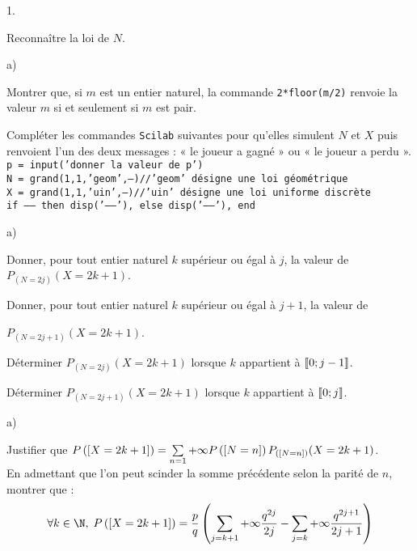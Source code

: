 \documentclass[11pt]{article}%
\begin{document}
\begin{noliste}{1.}
 \setlength{\itemsep}{4mm}
\item Reconnaître la loi de $N$.

\item 
\begin{noliste}{a)}
 \setlength{\itemsep}{2mm}
\item Montrer que, si $m$ est un entier naturel, la commande
\texttt{2*floor(m/2)} renvoie la valeur $m$ si et seulement si $m$ est
pair.

\item Compléter les commandes \texttt{Scilab} suivantes pour qu'elles
simulent $N$ et $X$ puis renvoient l'un des deux messages : « le joueur
a gagné » ou « le joueur a perdu ».\\
\texttt{p = input('donner la valeur de p') \\
N = grand(1,1,'geom',---)//'geom' désigne une loi géométrique\\
X = grand(1,1,'uin',---)//'uin' désigne une loi uniforme discrète \\
if ------ then disp('------'), else disp('------'), end}
\end{noliste}

\item 
\begin{noliste}{a)}
 \setlength{\itemsep}{2mm}
\item Donner, pour tout entier naturel $k$ supérieur ou égal à $j$, la
valeur de $P_{(N = 2j)}(X = 2k + 1)$.

\item Donner, pour tout entier naturel $k$ supérieur ou égal à $j + 1$,
la valeur de 

$P_{(N = 2j + 1)}(X = 2k + 1)$.

\item Déterminer $P_{(N = 2j)}(X = 2k + 1)$ lorsque $k$ appartient à
$\llbracket 0 ; j-1 \rrbracket$.

\item Déterminer $P_{(N = 2j + 1)}(X = 2k + 1)$ lorsque $k$ appartient
à $\llbracket 0 ; j \rrbracket$.
\end{noliste}

\item 
\begin{noliste}{a)}
 \setlength{\itemsep}{2mm}
\item 
Justifier que $P\left(\left[ {X = 2k + 1} \right]\right) = \sum\limits_{n = 1}{+
\infty} P\left(\left[ {N = n} \right]\right)P_{\left(\left[ {N = n} \right]\right)}(X = 2k +
1)$.\\
En admettant que l'on peut scinder la somme précédente selon la parité
de $n$, montrer que :
\[
\forall k\in \N,\; P\left(\Ev{X = 2k + 1}\right) = \dfrac{p}{q}\left(
\dsum\limits_{j = k + 1}{+ \infty} \dfrac{q^{2j}}{2j}-\dsum\limits_{j =
k}{+ \infty} \dfrac{q^{2j + 1}}{2j + 1}\right) 
\]


\end{noliste}
\end{noliste}
\end{document}
